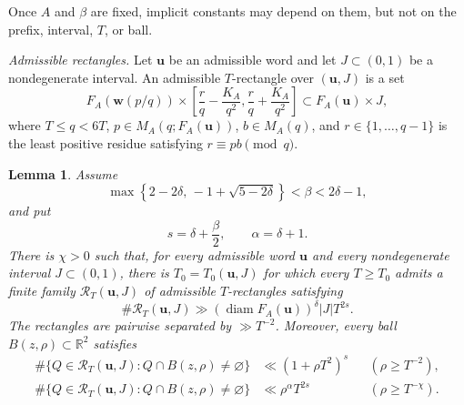 \documentclass[11pt]{amsart}
\newtheorem{lemma}[theorem]{Lemma}
\newcommand{\R}{\mathbb R}
\newcommand{\diam}{\operatorname{diam}}
\begin{document}
Once $A$ and $\beta$ are fixed, implicit constants may depend on them, but not
on the prefix, interval, $T$, or ball.

\medskip
\noindent\emph{Admissible rectangles.}
Let $\mathbf{u}$ be an admissible word and let $J\subset(0,1)$ be a nondegenerate
interval.  An admissible $T$-rectangle over $(\mathbf{u},J)$ is a set
\begin{equation}\label{eq:pair-rectangle-form}
 F_A(\mathbf{w}(p/q))\times
 \left[\frac rq-\frac{K_A}{q^2},\frac rq+\frac{K_A}{q^2}\right]
 \subset F_A(\mathbf{u})\times J,
\end{equation}
where $T\le q<6T$, $p\in M_A(q;F_A(\mathbf{u}))$, $b\in M_A(q)$,
and $r\in\{1,\ldots,q-1\}$ is the least positive residue satisfying
$r\equiv pb\pmod q$.


\begin{lemma}\label{lem:pair-rectangles}
Assume
\begin{equation}\label{eq:beta-range}
 \max\left\{2-2\delta,\,-1+\sqrt{5-2\delta}\right\}<\beta<2\delta-1,
\end{equation}
and put
\begin{equation}\label{eq:s-a-def}
 s=\delta+\frac\beta2,\qquad \alpha=\delta+1.
\end{equation}
There is $\chi>0$ such that, for every admissible word $\mathbf{u}$ and every
nondegenerate interval $J\subset(0,1)$, there is $T_0=T_0(\mathbf{u},J)$ for
which every $T\ge T_0$ admits a finite family $\mathcal R_T(\mathbf{u},J)$ of
admissible $T$-rectangles satisfying
\begin{equation}\label{eq:pair-rectangle-lower}
 \#\mathcal R_T(\mathbf{u},J)
 \gg (\diam F_A(\mathbf{u}))^\delta |J|T^{2s}.
\end{equation}
The rectangles are pairwise separated by $\gg T^{-2}$.  Moreover, every ball
$B(z,\rho)\subset\R^2$ satisfies
\begin{align}
 \#\{Q\in\mathcal R_T(\mathbf{u},J):Q\cap B(z,\rho)\ne\varnothing\}
 &\ll (1+\rho T^2)^s &&(\rho\ge T^{-2}),
 \label{eq:pair-local-s}\\
 \#\{Q\in\mathcal R_T(\mathbf{u},J):Q\cap B(z,\rho)\ne\varnothing\}
 &\ll \rho^\alpha T^{2s} &&(\rho\ge T^{-\chi}).
 \label{eq:pair-local-a}
\end{align}
\end{lemma}
\end{document}
